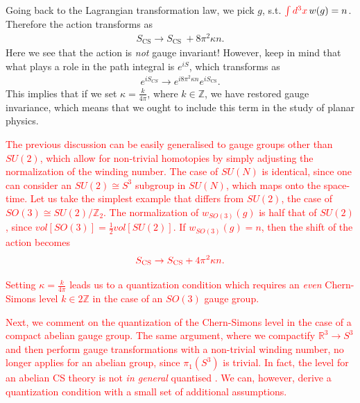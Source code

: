     Going back to the Lagrangian transformation law, we pick $g$, s.t. $\textcolor{red}{\int d^3 x} \,w(g)=n$. Therefore the action transforms as
    \begin{align}
        S_{\text{CS}} \rightarrow S_{\text{CS } }+ 8 \pi^2 \kappa n.
    \end{align}
    Here we see that the action is \textit{not} gauge invariant! However, keep in mind that what plays a role in the path integral is $e^{i S}$, which transforms as
    \begin{align}
        e^{i S_{CS}} \rightarrow e^{i 8 \pi^2 \kappa n} e^{i S_{\text{CS}}}.
    \end{align}
    This implies that if we set $\kappa = \frac{k}{4 \pi}$, where $k\in \mathbb{Z}$, we have restored gauge invariance, which means that we ought to include this term in the study of planar physics.

    \textcolor{red}{The previous discussion can be easily generali\textcolor{red}{s}ed to gauge groups other than $SU(2)$, which allow for non-trivial homotopies by simply adjusting the normalization of the winding number. The case of $SU(N)$ is identical, since one can consider an $SU(2) \cong S^3$ subgroup in $SU(N)$, which maps onto the space-time. Let us take the simplest example that differs from $SU(2)$, the case of $SO(3)\cong SU(2)/ \mathbb{Z}_2$. The normalization of $w_{SO(3)}(g)$ is half that of $SU(2)$, since $vol[SO(3)] = \frac{1}{2} vol[SU(2)]$. If $w_{SO(3)}(g)=n$, then the shift of the action becomes }
\begin{align}
    \textcolor{red}{S_{\text{CS}} \rightarrow S_{\text{CS}}+ 4\pi^2 \kappa n.}
\end{align}

\textcolor{red}{Setting $\kappa = \frac{k}{4 \pi}$ leads us to a quantization condition which requires an \textit{even} Chern-Simons level $k \in 2\mathbb{Z}$ in the case of an $SO(3)$ gauge group.}

\textcolor{red}{Next, we comment on the quantization of the Chern-Simons level in the case of a compact abelian gauge group. The same argument, where we compactify $\mathbb{R}^3 \rightarrow S^{3}$ and then perform gauge transformations with a non-trivial winding number, no longer applies for an abelian group, since $\pi_1(S^3)$ is trivial. In fact, the level for an abelian CS theory is not \textit{in general} quanti\textcolor{red}{s}ed \cite{Polychronakos:1990xq}. We can, however, derive a quantization condition with a small set of additional assumptions.}

